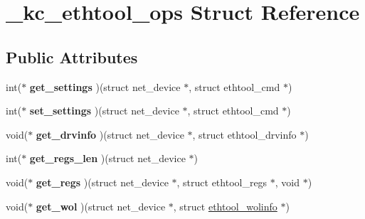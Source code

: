 \hypertarget{struct__kc__ethtool__ops}{
\section{\_\-kc\_\-ethtool\_\-ops Struct Reference}
\label{struct__kc__ethtool__ops}
}
\subsection*{Public Attributes}
\begin{DoxyCompactItemize}
\item 
\hypertarget{struct__kc__ethtool__ops_a9cb7933faa4d2b1467718a936ce7fa36}{
int($\ast$ {\bfseries get\_\-settings} )(struct net\_\-device $\ast$, struct ethtool\_\-cmd $\ast$)}
\label{struct__kc__ethtool__ops_a9cb7933faa4d2b1467718a936ce7fa36}

\item 
\hypertarget{struct__kc__ethtool__ops_a8615cf3dfe277ea74b7b70fc159759d6}{
int($\ast$ {\bfseries set\_\-settings} )(struct net\_\-device $\ast$, struct ethtool\_\-cmd $\ast$)}
\label{struct__kc__ethtool__ops_a8615cf3dfe277ea74b7b70fc159759d6}

\item 
\hypertarget{struct__kc__ethtool__ops_a5f8d6859295e6caa90d1e4865fc205ab}{
void($\ast$ {\bfseries get\_\-drvinfo} )(struct net\_\-device $\ast$, struct ethtool\_\-drvinfo $\ast$)}
\label{struct__kc__ethtool__ops_a5f8d6859295e6caa90d1e4865fc205ab}

\item 
\hypertarget{struct__kc__ethtool__ops_ad5c8632f4e07a23f097938babfc01d1f}{
int($\ast$ {\bfseries get\_\-regs\_\-len} )(struct net\_\-device $\ast$)}
\label{struct__kc__ethtool__ops_ad5c8632f4e07a23f097938babfc01d1f}

\item 
\hypertarget{struct__kc__ethtool__ops_a4bd8339e987ab7b6ad0f10e062c5a30c}{
void($\ast$ {\bfseries get\_\-regs} )(struct net\_\-device $\ast$, struct ethtool\_\-regs $\ast$, void $\ast$)}
\label{struct__kc__ethtool__ops_a4bd8339e987ab7b6ad0f10e062c5a30c}

\item 
\hypertarget{struct__kc__ethtool__ops_a1f68233628ac2598dd8e8a4557d5b196}{
void($\ast$ {\bfseries get\_\-wol} )(struct net\_\-device $\ast$, struct \hyperlink{structethtool__wolinfo}{ethtool\_\-wolinfo} $\ast$)}
\label{struct__kc__ethtool__ops_a1f68233628ac2598dd8e8a4557d5b196}


\end{DoxyCompactItemize}
